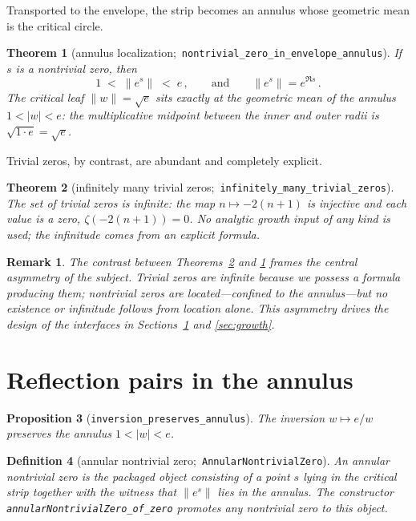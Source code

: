 \documentclass[submission]{jsfds}
\newtheorem{theorem}{Theorem}
\newtheorem{proposition}[theorem]{Proposition}
\newtheorem{definition}[theorem]{Definition}
\newtheorem*{remark}{Remark}
\newcommand{\Lean}[1]{\texttt{#1}}
\newcommand{\abs}[1]{\lvert #1\rvert}
\newcommand{\Norm}[1]{\lVert #1\rVert}
\begin{document}
Transported to the envelope, the strip becomes an annulus whose geometric mean
is the critical circle.

\begin{theorem}[annulus localization;\,
\Lean{nontrivial_zero_in_envelope_annulus}]\label{thm:annulus}
If $s$ is a nontrivial zero, then
\[
  1 \;<\; \Norm{e^{s}} \;<\; e\, ,
  \qquad\text{and}\qquad
  \Norm{e^{s}} = e^{\Re s}\, .
\]
The critical leaf $\Norm{w}=\sqrt{e}$ sits exactly at the geometric mean of the
annulus $1<\abs{w}<e$: the multiplicative midpoint between the inner and outer
radii is $\sqrt{1\cdot e}=\sqrt{e}$.
\end{theorem}

Trivial zeros, by contrast, are abundant and completely explicit.

\begin{theorem}[infinitely many trivial zeros;\,
\Lean{infinitely_many_trivial_zeros}]\label{thm:trivial}
The set of trivial zeros is infinite: the map $n\mapsto -2(n+1)$ is injective
and each value is a zero, $\zeta(-2(n+1))=0$. No analytic growth input of any
kind is used; the infinitude comes from an explicit formula.
\end{theorem}

\begin{remark}
The contrast between Theorems~\ref{thm:trivial} and \ref{thm:annulus} frames the
central asymmetry of the subject. Trivial zeros are infinite because we possess
a formula producing them; nontrivial zeros are located---confined to the
annulus---but no existence or infinitude follows from location alone. This
asymmetry drives the design of the interfaces in
Sections~\ref{sec:pairs} and \ref{sec:growth}.
\end{remark}

\section{Reflection pairs in the annulus}\label{sec:pairs}

\begin{proposition}[\Lean{inversion_preserves_annulus}]\label{prop:preserves}
The inversion $w\mapsto e/w$ preserves the annulus $1<\abs{w}<e$.
\end{proposition}

\begin{definition}[annular nontrivial zero;\,
\Lean{AnnularNontrivialZero}]\label{def:annzero}
An \emph{annular nontrivial zero} is the packaged object consisting of a point
$s$ lying in the critical strip together with the witness that
$\Norm{e^{s}}$ lies in the annulus. The constructor
\Lean{annularNontrivialZero_of_zero} promotes any nontrivial zero to this
object.
\end{definition}
\end{document}
